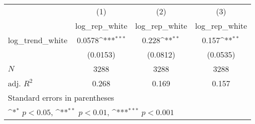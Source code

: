 {
\def\sym#1{\ifmmode^{#1}\else\(^{#1}\)\fi}
\begin{tabular}{l*{3}{c}}
\hline\hline
            &\multicolumn{1}{c}{(1)}&\multicolumn{1}{c}{(2)}&\multicolumn{1}{c}{(3)}\\
            &\multicolumn{1}{c}{log\_rep\_white}&\multicolumn{1}{c}{log\_rep\_white}&\multicolumn{1}{c}{log\_rep\_white}\\
\hline
log\_trend\_white&      0.0578\sym{***}&       0.228\sym{**} &       0.157\sym{**} \\
            &    (0.0153)         &    (0.0812)         &    (0.0535)         \\
\hline
\(N\)       &        3288         &        3288         &        3288         \\
adj. \(R^{2}\)&       0.268         &       0.169         &       0.157         \\
\hline\hline
\multicolumn{4}{l}{\footnotesize Standard errors in parentheses}\\
\multicolumn{4}{l}{\footnotesize \sym{*} \(p<0.05\), \sym{**} \(p<0.01\), \sym{***} \(p<0.001\)}\\
\end{tabular}
}
